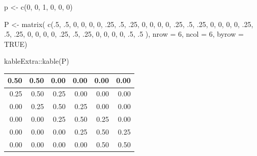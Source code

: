 \documentclass[
  11pt,
]{krantz}
\makeatletter
\newenvironment{Shaded}{\begin{snugshade}}{\end{snugshade}}
\newcommand{\AttributeTok}[1]{\textcolor[rgb]{0.61,0.61,0.61}{#1}}
\newcommand{\ConstantTok}[1]{\textcolor[rgb]{0,0,0}{#1}}
\newcommand{\DecValTok}[1]{\textcolor[rgb]{0.06,0.06,0.06}{#1}}
\newcommand{\FunctionTok}[1]{\textcolor[rgb]{0,0,0}{#1}}
\newcommand{\NormalTok}[1]{#1}
\newcommand{\OtherTok}[1]{\textcolor[rgb]{0.37,0.37,0.37}{#1}}
\newcommand{\SpecialCharTok}[1]{\textcolor[rgb]{0,0,0}{#1}}
\newenvironment{kframe}{%
\medskip{}
\setlength{\fboxsep}{.8em}
 \def\at@end@of@kframe{}%
 \ifinner\ifhmode%
  \def\at@end@of@kframe{\end{minipage}}%
  \begin{minipage}{\columnwidth}%
 \fi\fi%
 \def\FrameCommand##1{\hskip\@totalleftmargin \hskip-\fboxsep
 \colorbox{shadecolor}{##1}\hskip-\fboxsep
     \hskip-\linewidth \hskip-\@totalleftmargin \hskip\columnwidth}%
 \MakeFramed {\advance\hsize-\width
   \@totalleftmargin\z@ \linewidth\hsize
   \@setminipage}}%
 {\par\unskip\endMakeFramed%
 \at@end@of@kframe}
\renewenvironment{Shaded}{\begin{kframe}}{\end{kframe}}
\theoremstyle{definition}
\theoremstyle{definition}
\theoremstyle{definition}
\theoremstyle{definition}
\theoremstyle{remark}
\makeatother
\begin{document}
\begin{Shaded}
\begin{Highlighting}[]
\NormalTok{p }\OtherTok{\textless{}{-}} \FunctionTok{c}\NormalTok{(}\DecValTok{0}\NormalTok{, }\DecValTok{0}\NormalTok{, }\DecValTok{1}\NormalTok{, }\DecValTok{0}\NormalTok{, }\DecValTok{0}\NormalTok{, }\DecValTok{0}\NormalTok{)}

\NormalTok{P }\OtherTok{\textless{}{-}} \FunctionTok{matrix}\NormalTok{(}
  \FunctionTok{c}\NormalTok{(.}\DecValTok{5}\NormalTok{, .}\DecValTok{5}\NormalTok{, }\DecValTok{0}\NormalTok{, }\DecValTok{0}\NormalTok{, }\DecValTok{0}\NormalTok{, }\DecValTok{0}\NormalTok{,}
\NormalTok{    .}\DecValTok{25}\NormalTok{, .}\DecValTok{5}\NormalTok{, .}\DecValTok{25}\NormalTok{, }\DecValTok{0}\NormalTok{, }\DecValTok{0}\NormalTok{, }\DecValTok{0}\NormalTok{,}
    \DecValTok{0}\NormalTok{, .}\DecValTok{25}\NormalTok{, .}\DecValTok{5}\NormalTok{, .}\DecValTok{25}\NormalTok{, }\DecValTok{0}\NormalTok{, }\DecValTok{0}\NormalTok{,}
    \DecValTok{0}\NormalTok{, }\DecValTok{0}\NormalTok{, .}\DecValTok{25}\NormalTok{, .}\DecValTok{5}\NormalTok{, .}\DecValTok{25}\NormalTok{, }\DecValTok{0}\NormalTok{,}
    \DecValTok{0}\NormalTok{, }\DecValTok{0}\NormalTok{, }\DecValTok{0}\NormalTok{, .}\DecValTok{25}\NormalTok{, .}\DecValTok{5}\NormalTok{, .}\DecValTok{25}\NormalTok{,}
    \DecValTok{0}\NormalTok{, }\DecValTok{0}\NormalTok{, }\DecValTok{0}\NormalTok{, }\DecValTok{0}\NormalTok{, .}\DecValTok{5}\NormalTok{, .}\DecValTok{5}
\NormalTok{    ),}
  \AttributeTok{nrow =} \DecValTok{6}\NormalTok{, }\AttributeTok{ncol =} \DecValTok{6}\NormalTok{, }\AttributeTok{byrow =} \ConstantTok{TRUE}\NormalTok{)}

\NormalTok{kableExtra}\SpecialCharTok{::}\FunctionTok{kable}\NormalTok{(P)}
\end{Highlighting}
\end{Shaded}

\begin{tabular}{r|r|r|r|r|r}
\hline
0.50 & 0.50 & 0.00 & 0.00 & 0.00 & 0.00\\
\hline
0.25 & 0.50 & 0.25 & 0.00 & 0.00 & 0.00\\
\hline
0.00 & 0.25 & 0.50 & 0.25 & 0.00 & 0.00\\
\hline
0.00 & 0.00 & 0.25 & 0.50 & 0.25 & 0.00\\
\hline
0.00 & 0.00 & 0.00 & 0.25 & 0.50 & 0.25\\
\hline
0.00 & 0.00 & 0.00 & 0.00 & 0.50 & 0.50\\
\hline
\end{tabular}
\end{document}
